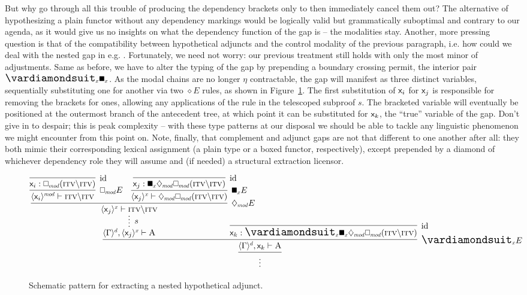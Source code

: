 But why go through all this trouble of producing the dependency brackets only to then immediately cancel them out?
The alternative of hypothesizing a plain functor without any dependency markings would be logically valid but grammatically suboptimal and contrary to our agenda, as it would give us no insights on what the dependency function of the gap is -- the modalities stay.
Another, more pressing question is that of the compatibility between hypothetical adjuncts and the control modality of the previous paragraph, i.e. how could we deal with the nested gap in e.g. .
Fortunately, we need not worry: our previous treatment still holds with only the most minor of adjustments.
Same as before, we have to alter the typing of the gap by prepending a boundary crossing permit, the interior pair $\dxdia{x}\dxbox{x}$.
As the modal chains are no longer $\eta$ contractable, the gap will manifest as three distinct variables, sequentially substituting one for another via two $\diamond E$ rules, as shown in Figure~\ref{figure:higher_order_nested_dep}.
The first substitution of $\mathsf{x}_{\mathnormal{i}}$ for $\mathsf{x}_{\mathnormal{j}}$ is responsible for removing the  brackets for  ones, allowing any applications of the \Extraction{} rule in the telescoped subproof $s$.
The bracketed variable will eventually be positioned at the outermost branch of the antecedent tree, at which point it can be substituted for $\mathsf{x}_{\mathnormal{k}}$, the ``true'' variable of the gap.
Don't give in to despair; this is peak complexity -- with these type patterns at our disposal we should be able to tackle any linguistic phenomenon we might encounter from this point on.
Note, finally, that complement and adjunct gaps are not that different to one another after all: they both mimic their corresponding lexical assignment (a plain type or a boxed functor, respectively), except prepended by a diamond of whichever dependency role they will assume and (if needed) a structural extraction licensor.


\begin{figure}
	\smaller
	\[
		\infer{\vdots}{
			\infer[\dxdia{x} E]{\dbra{\Gamma}{d}, \vark \vdash \prop{A}}{
				\infer*[s]{\dbra{\Gamma}{d}, \dbra{\varj}{x} \vdash \prop{A}}{
					\infer[\ddia{mod} E]{\dbra{\varj}{x} \vdash \gtype{itv}\divleft\gtype{itv}}{
						\infer[\dbox{mod} E]{\dbra{\vari}{mod} \vdash \gtype{itv}\divleft\gtype{itv}}{
							\infer[\Ax]{\vari : \dbox{mod}(\gtype{itv}\divleft\gtype{itv})}{}
						}
						&
						\infer[\dxbox{x} E]{\dbra{\varj}{x} \vdash \ddia{mod}\dbox{mod}(\gtype{itv}\divleft\gtype{itv})}{
							\infer[\Ax]{\varj : \dxbox{x}\ddia{mod}\dbox{mod}(\gtype{itv}\divleft\gtype{itv})}{}
						}
					}
				}
				&
				\hspace{-40pt}
				\infer[\Ax]{\vark : \dxdia{x}\dxbox{x}\ddia{mod}\dbox{mod}(\gtype{itv}\divleft\gtype{itv})}{}
			}
		}
	\]
	\caption{Schematic pattern for extracting a nested hypothetical adjunct.}
	\label{figure:higher_order_nested_dep}
\end{figure}

